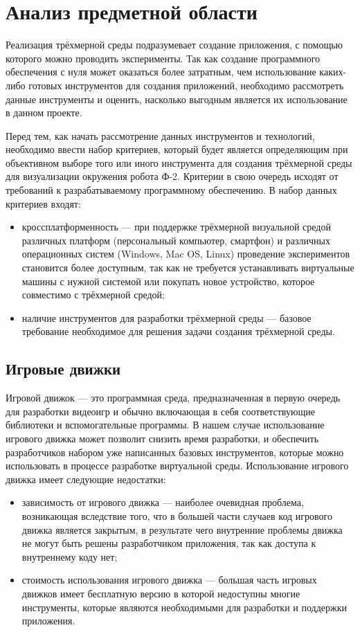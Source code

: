 \chapter{Анализ предметной области}
Реализация трёхмерной среды подразумевает создание приложения, с помощью которого можно проводить эксперименты. Так как создание программного обеспечения с нуля может оказаться более затратным, чем использование каких-либо готовых инструментов для создания приложений, необходимо рассмотреть данные инструменты и оценить, насколько выгодным является их использование в данном проекте.

Перед тем, как начать рассмотрение данных инструментов и технологий, необходимо ввести набор критериев, который будет является определяющим при объективном выборе того или иного инструмента для создания трёхмерной среды для визуализации окружения робота Ф-2. Критерии в свою очередь исходят от требований к разрабатываемому программному обеспечению. В набор данных критериев входят:
\begin{itemize}
\item кроссплатформенность --- при поддержке трёхмерной визуальной средой различных платформ (персональный компьютер, смартфон) и различных операционных систем (Windows, Mac OS, Linux) проведение экспериментов становится более доступным, так как не требуется устанавливать виртуальные машины с нужной системой или покупать новое устройство, которое совместимо с трёхмерной средой;
\item наличие инструментов для разработки трёхмерной среды --- базовое требование необходимое для решения задачи создания трёхмерной среды.
\end{itemize}

\section{Игровые движки}

Игровой движок --- это программная среда, предназначенная в первую очередь для разработки видеоигр и обычно включающая в себя соответствующие библиотеки и вспомогательные программы. \cite{gmengine_opr} В нашем случае использование игрового движка может позволит снизить время разработки, и обеспечить разработчиков набором уже написанных базовых инструментов, которые можно использовать в процессе разработке виртуальной среды. Использование игрового движка имеет следующие недостатки:
\begin{itemize}
\item зависимость от игрового движка --- наиболее очевидная проблема, возникающая вследствие того, что в большей части случаев код игрового движка является закрытым, в результате чего внутренние проблемы движка не могут быть решены разработчиком приложения, так как доступа к внутреннему коду нет;
\item стоимость использования игрового движка --- большая часть игровых движков имеет бесплатную версию в которой недоступны многие инструменты, которые являются необходимыми для разработки и поддержки приложения.
\end{itemize}

